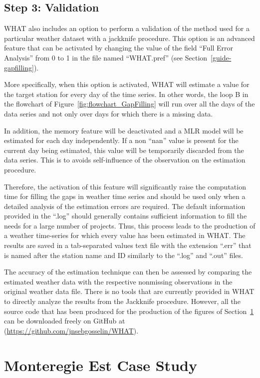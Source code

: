 \documentclass[WHATMANUAL.tex]{subfiles}
\begin{document}
\subsection{Step 3: Validation}

WHAT also includes an option to perform a validation of the method used for a particular weather dataset with a jackknife procedure. This option is an advanced feature that can be activated by changing the value of the field ``Full Error Analysis'' from 0 to 1 in the file named ``WHAT.pref'' (see Section~\ref{guide-gapfilling}).

More specifically, when this option is activated, WHAT will estimate a value for the target station for every day of the time series. In other words, the loop B in the flowchart of Figure~\ref{fig:flowchart_GapFilling} will run over all the days of the data series and not only over days for which there is a missing data.

In addition, the memory feature will be deactivated and a MLR model will be estimated for each day independently. If a non ``nan'' value is present for the current day being estimated, this value will be temporarily discarded from the data series. This is to avoids self-influence of the observation on the estimation procedure.

Therefore, the activation of this feature will significantly raise the computation time for filling the gaps in weather time series and should be used only when a detailed analysis of the estimation errors are required. The default information provided in the ``.log'' should generally contains sufficient information to fill the needs for a large number of projects. Thus, this process leads to the production of a weather time-series for which every value has been estimated in WHAT. The results are saved in a tab-separated values text file with the extension ``.err'' that is named after the station name and ID similarly to the ``.log'' and ``.out'' files.

The accuracy of the estimation technique can then be assessed by comparing the estimated weather data with the respective nonmissing observations in the original weather data file. There is no tools that are currently provided in WHAT to directly analyze the results from the Jackknife procedure. However, all the source code that has been produced for the production of the figures of Section~\ref{sec:gapFilling_MontEstCase} can be downloaded freely on GitHub at (\url{https://github.com/jnsebgosselin/WHAT}).

\section{Monteregie Est Case Study}\label{sec:gapFilling_MontEstCase}
\end{document}
